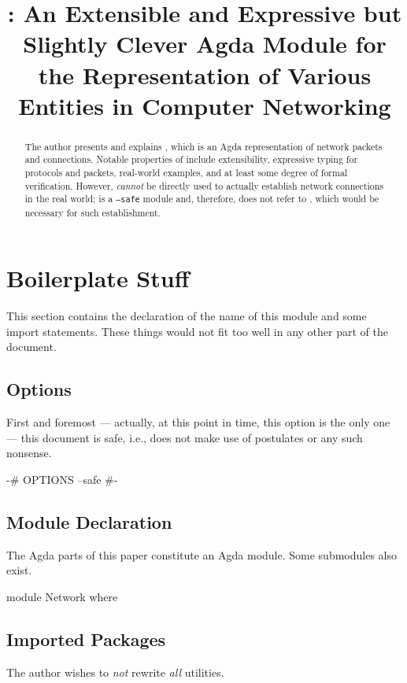 \documentclass{report}
\title{\AgdaModule{Network}: An Extensible and Expressive but Slightly Clever Agda Module for the Representation of Various Entities in Computer Networking}
\begin{document}
\maketitle{}

\begin{abstract}
The author presents and explains , which is an Agda representation of network packets and connections.  Notable properties of  include extensibility, expressive typing for protocols and packets, real-world examples, and at least some degree of formal verification.  However,  \emph{cannot} be directly used to actually establish network connections in the real world;  is a \texttt{--safe} module and, therefore, does not refer to , which would be necessary for such establishment.
\end{abstract}

\chapter{Boilerplate Stuff}
This section contains the declaration of the name of this module and some import statements.  These things would not fit too well in any other part of the document.

\section{Options}
First and foremost --- actually, at this point in time, this option is the only one --- this document is safe, i.e., does not make use of postulates or any such nonsense.

\begin{code}
{-# OPTIONS --safe #-}
\end{code}

\section{Module Declaration}
The Agda parts of this paper constitute an Agda module.  Some submodules also exist.

\begin{code}
module Network where
\end{code}

\section{Imported Packages}
The author wishes to \emph{not} rewrite \emph{all} utilities.
\end{document}
